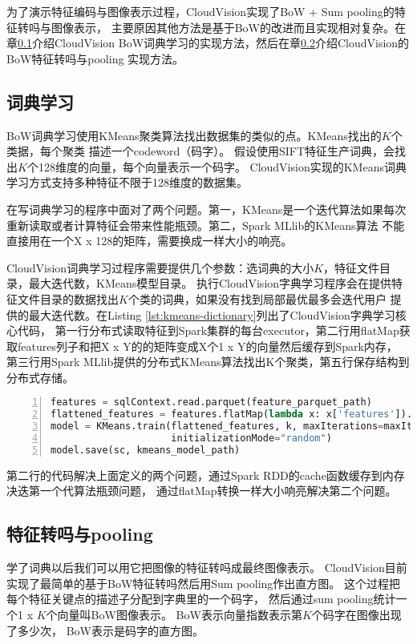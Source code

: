 为了演示特征编码与图像表示过程，CloudVision实现了BoW + Sum pooling的特征转吗与图像表示，
主要原因其他方法是基于BoW的改进而且实现相对复杂。在章\ref{subsec:dict-learning}介绍CloudVision
BoW词典学习的实现方法，然后在章\ref{subsec:feature-encoding}介绍CloudVision的BoW特征转吗与pooling
实现方法。

\subsection{词典学习}
\label{subsec:dict-learning}
BoW词典学习使用KMeans聚类算法找出数据集的类似的点。KMeans找出的$K$个类据，每个聚类
描述一个codeword（码字）。
假设使用SIFT特征生产词典，会找出$K$个128维度的向量，每个向量表示一个码字。
CloudVision实现的KMeans词典学习方式支持多种特征不限于128维度的数据集。

在写词典学习的程序中面对了两个问题。第一，KMeans是一个迭代算法如果每次
重新读取或者计算特征会带来性能瓶颈。第二，Spark MLlib的KMeans算法
不能直接用在一个X x 128的矩阵，需要换成一样大小的响亮。

CloudVision词典学习过程序需要提供几个参数：选词典的大小$K$，特征文件目录，最大迭代数，KMeans模型目录。
执行CloudVision字典学习程序会在提供特征文件目录的数据找出$K$个类的词典，如果没有找到局部最优最多会迭代用户
提供的最大迭代数。在Listing \ref{lst:kmeans-dictionary}列出了CloudVision字典学习核心代码，
第一行分布式读取特征到Spark集群的每台executor，第二行用flatMap获取features列子和把X x Y的的矩阵变成X个1 x Y的向量然后缓存到Spark内存，
第三行用Spark MLlib提供的分布式KMeans算法找出K个聚类，第五行保存结构到分布式存储。
\begin{lstlisting}[language=Python,
                   basicstyle=\small,
                   showstringspaces=false,
                   numbers=left,
                   caption={词典学习核心代码},
                   label={lst:kmeans-dictionary}]
features = sqlContext.read.parquet(feature_parquet_path)
flattened_features = features.flatMap(lambda x: x['features']).cache()
model = KMeans.train(flattened_features, k, maxIterations=maxIter,
                     initializationMode="random")
model.save(sc, kmeans_model_path)
\end{lstlisting}
第二行的代码解决上面定义的两个问题，通过Spark RDD的cache函数缓存到内存决迭第一个代算法瓶颈问题，
通过flatMap转换一样大小响亮解决第二个问题。


\subsection{特征转吗与pooling}
\label{subsec:feature-encoding}
学了词典以后我们可以用它把图像的特征转吗成最终图像表示。
CloudVision目前实现了最简单的基于BoW特征转吗然后用Sum pooling作出直方图。
这个过程把每个特征关键点的描述子分配到字典里的一个码字，
然后通过sum pooling统计一个1 x $K$个向量叫BoW图像表示。
BoW表示向量指数表示第$K$个码字在图像出现了多少次，
BoW表示是码字的直方图。

